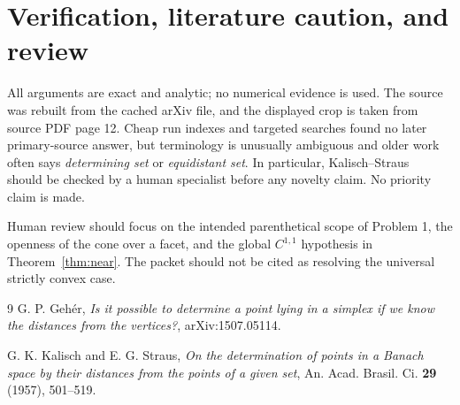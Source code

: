 \documentclass[11pt]{amsart}
\theoremstyle{remark}
\begin{document}
\section{Verification, literature caution, and review}

All arguments are exact and analytic; no numerical evidence is used.  The
source was rebuilt from the cached arXiv file, and the displayed crop is taken
from source PDF page 12.  Cheap run indexes and targeted searches found no
later primary-source answer, but terminology is unusually ambiguous and older
work often says \emph{determining set} or \emph{equidistant set}.  In
particular, Kalisch--Straus~\cite{KalischStraus} should be checked by a human
specialist before any novelty claim.  No priority claim is made.

Human review should focus on the intended parenthetical scope of Problem 1,
the openness of the cone over a facet, and the global $C^{1,1}$ hypothesis in
Theorem~\ref{thm:near}.  The packet should not be cited as resolving the
universal strictly convex case.

\begin{thebibliography}{9}
G. P. Geh\'er,
\emph{Is it possible to determine a point lying in a simplex if we know the
distances from the vertices?}, arXiv:1507.05114.

G. K. Kalisch and E. G. Straus,
\emph{On the determination of points in a Banach space by their distances from
the points of a given set}, An. Acad. Brasil. Ci. \textbf{29} (1957), 501--519.
\end{thebibliography}
\end{document}
